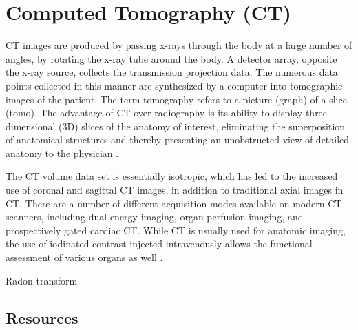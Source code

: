 \chapter{Computed Tomography (CT)}

CT images are produced by passing x-rays through the body at a large
number of angles, by rotating the x-ray tube around the body. A
detector array, opposite the x-ray source, collects the transmission
projection data. The numerous data points collected in this manner are
synthesized by a computer into tomographic images of the patient. The
term tomography refers to a picture (graph) of a slice (tomo). The
advantage of CT over radiography is its ability to display
three-dimensional (3D) slices of the anatomy of interest, eliminating
the superposition of anatomical structures and thereby presenting an
unobstructed view of detailed anatomy to the physician
\cite{bushberg2011essential}.

The CT volume data set is essentially isotropic, which has led to
the increased use of coronal and sagittal CT images, in addition to
traditional axial images in CT. There are a number of different
acquisition modes available on modern CT scanners, including
dual-energy imaging, organ perfusion imaging, and prospectively gated
cardiac CT. While CT is usually used for anatomic imaging, the use of
iodinated contrast injected intravenously allows the functional
assessment of various organs as well \cite{bushberg2011essential}.

Radon transform


\section{Resources}


